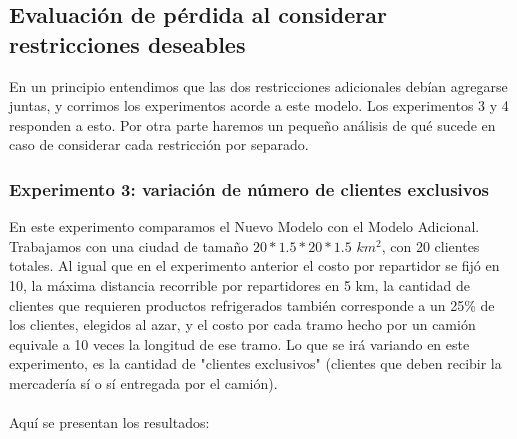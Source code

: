 \documentclass{article}
\begin{document}
    
    \subsection{Evaluación de pérdida al considerar restricciones deseables}
    En un principio entendimos que las dos restricciones adicionales debían agregarse juntas, y corrimos los experimentos acorde a este modelo. Los experimentos 3 y 4 responden a esto. Por otra parte haremos un pequeño análisis de qué sucede en caso de considerar cada restricción por separado.

    
    \subsubsection{Experimento 3: variación de número de clientes exclusivos}
    
    En este experimento comparamos el Nuevo Modelo con el Modelo Adicional. Trabajamos con una ciudad de tamaño $20 * 1.5 * 20 * 1.5$ $km^{2}$, con 20 clientes totales. Al igual que en el experimento anterior el costo por repartidor se fijó en 10, la máxima distancia recorrible por repartidores en 5 km, la cantidad de clientes que requieren productos refrigerados también corresponde a un 25\% de los clientes, elegidos al azar, y el costo por cada tramo hecho por un camión equivale a 10 veces la longitud de ese tramo. Lo que se irá variando en este experimento, es la cantidad de "clientes exclusivos" (clientes que deben recibir la mercadería sí o sí entregada por el camión). \\
    \\
    Aquí se presentan los resultados: 
    
    \begin{table}[H]
    \centering
    \caption{Comparación de costos entre Nuevo Modelo y Modelo Adicional para diferentes cantidades de clientes exclusivos, versión I}
    \end{table}
    
\end{document}
